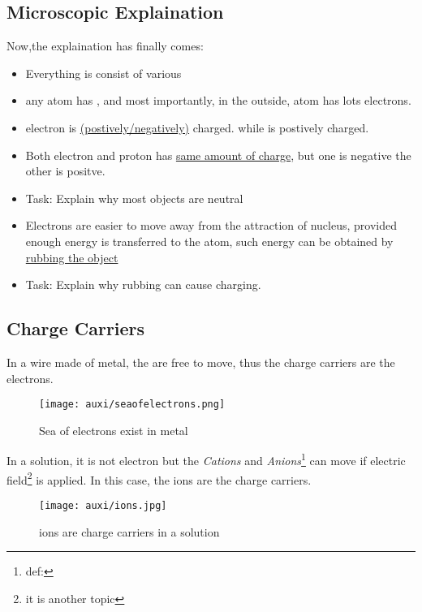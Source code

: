 \documentclass[a4paper]{tufte-handout}
\begin{document}
\subsection{Microscopic Explaination}
Now,the explaination has finally comes:
\begin{itemize}
  \setlength{\parsep}{0pt}
  \item Everything is consist of various \uline{\hspace{1in}}
  \item any atom has \uline{\hspace{1in}}, and most importantly, in the outside, atom has lots electrons.
  \item electron is \uline{(postively/negatively)} charged. while \uline{\hspace{1in}} is postively charged.
  \item Both electron and proton has \uline{same amount of charge}, but one is negative the other is positve.
  \item Task: Explain why most objects are neutral
  \vspace{0.6in}
  \item Electrons are easier to move away from the attraction of nucleus, provided enough energy is transferred to the atom, such energy can be obtained by \uline{rubbing the object}
  \item Task: Explain why rubbing can cause charging.
  \vspace{0.6in} 
\end{itemize}

\subsection{Charge Carriers}
In a wire made of metal, the \uline{\hspace{1in}} are free to move, thus the charge carriers are the electrons.
\begin{figure}[h]
\texttt{[image: auxi/seaofelectrons.png]}
\caption{Sea of electrons exist in metal}
\end{figure}

In a solution, it is not electron but the \emph{Cations} and \emph{Anions}\footnote{def:} can move if electric field\footnote{it is another topic} is applied. In this case, the ions are the charge carriers.
\begin{figure}[h]
\texttt{[image: auxi/ions.jpg]}
\caption{ions are charge carriers in a solution}
\end{figure}
\end{document}

